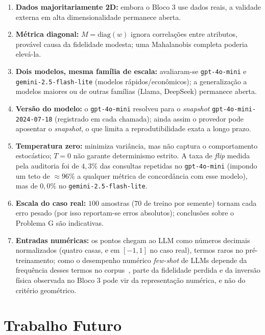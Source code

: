 \documentclass[12pt,a4paper]{article}
\begin{document}
\begin{enumerate}
  \item \textbf{Dados majoritariamente 2D:} embora o Bloco 3 use dados reais, a validade
    externa em alta dimensionalidade permanece aberta.
  \item \textbf{Métrica diagonal:} $M=\mathrm{diag}(w)$ ignora correlações entre
    atributos, provável causa da fidelidade modesta; uma Mahalanobis completa poderia
    elevá-la.
  \item \textbf{Dois modelos, mesma família de escala:} avaliaram-se \texttt{gpt-4o-mini} e
    \texttt{gemini-2.5-flash-lite} (modelos rápidos/econômicos); a generalização a modelos
    maiores ou de outras famílias (Llama, DeepSeek) permanece aberta.
  \item \textbf{Versão do modelo:} o \texttt{gpt-4o-mini} resolveu para o \emph{snapshot}
    \texttt{gpt-4o-mini-2024-07-18} (registrado em cada chamada); ainda assim o provedor pode
    aposentar o \emph{snapshot}, o que limita a reprodutibilidade exata a longo prazo.
  \item \textbf{Temperatura zero:} minimiza variância, mas não captura o comportamento
    estocástico; $T=0$ não garante determinismo estrito. A taxa de \emph{flip} medida pela
    auditoria foi de $4{,}3\%$ das consultas repetidas no \texttt{gpt-4o-mini} (impondo um
    teto de $\approx 96\%$ a qualquer métrica de concordância com esse modelo), mas de
    $0{,}0\%$ no \texttt{gemini-2.5-flash-lite}.
  \item \textbf{Escala do caso real:} $100$ amostras ($70$ de treino por semente) tornam
    cada erro pesado (por
    isso reportam-se erros absolutos); conclusões sobre o Problema G são indicativas.
  \item \textbf{Entradas numéricas:} os pontos chegam ao LLM como números decimais
    normalizados (quatro casas, e em $[-1,1]$ no caso real), termos raros no
    pré-treinamento; como o desempenho numérico \emph{few-shot} de LLMs depende da
    frequência desses termos no corpus~\cite{razeghiImpactPretraining2022}, parte da
    fidelidade perdida e da inversão física observada no Bloco 3 pode vir da
    representação numérica, e não do critério geométrico.
\end{enumerate}

\section{Trabalho Futuro}
\label{sec:futuro}
\end{document}
